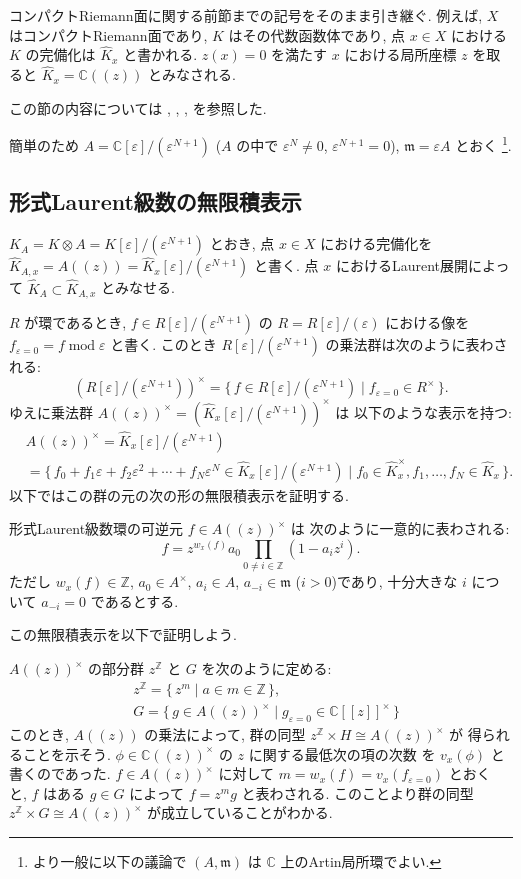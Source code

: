 \documentclass[12pt,twoside]{jarticle}
\newcommand\Z{{\mathbb Z}} %
\newcommand\C{{\mathbb C}} %
\theoremstyle{definition} %
\theoremstyle{definition} %
\theoremstyle{definition} %
\numberwithin{theorem}{section}
\numberwithin{equation}{section}
\numberwithin{figure}{section}
\numberwithin{table}{section}
\newcommand\Khat{{\widehat K}}
\newcommand\eps{\varepsilon}
\newcommand\m{{\mathfrak m}}
\newcommand\MOD{\operatorname{mod}}
\begin{document}
コンパクトRiemann面に関する前節までの記号をそのまま引き継ぐ.
例えば, $X$ はコンパクトRiemann面であり, $K$ はその代数函数体であり, 
点 $x\in X$ における $K$ の完備化は $\Khat_x$ と書かれる.
$z(x)=0$ を満たす $x$ における局所座標 $z$ を取ると $\Khat_x=\C((z))$
とみなされる.

この節の内容については \cite{kerr}, 
\cite{pablosromo}, \cite{luo}, \cite{horozov-luo}を参照した.

簡単のため $A=\C[\eps]/(\eps^{N+1})$ ($A$ の中で $\eps^N\ne0$, $\eps^{N+1}=0$), 
$\m=\eps A$ とおく%
\footnote{より一般に以下の議論で $(A,\m)$ は $\C$ 上のArtin局所環でよい.}.


\subsection{形式Laurent級数の無限積表示}

$K_A=K\otimes A=K[\eps]/(\eps^{N+1})$ とおき, 
点 $x\in X$ における完備化を $\Khat_{A,x}=A((z))=\Khat_x[\eps]/(\eps^{N+1})$ と書く.  
点 $x$ におけるLaurent展開によって $\Khat_A\subset\Khat_{A,x}$ とみなせる.

$R$ が環であるとき, $f\in R[\eps]/(\eps^{N+1})$ の $R=R[\eps]/(\eps)$ 
における像を $f_{\eps=0}=f\MOD\eps$ と書く.
このとき $R[\eps]/(\eps^{N+1})$ の乗法群は次のように表わされる:
\[
 \left( R[\eps]/(\eps^{N+1}) \right)^\times
 =\{\, f\in R[\eps]/(\eps^{N+1}) \mid f_{\eps=0}\in R^\times \,\}.
\]
ゆえに乗法群 $A((z))^\times=\left(\Khat_x[\eps]/(\eps^{N+1})\right)^\times$ は
以下のような表示を持つ:
\begin{align*}
&
A((z))^\times = \Khat_x[\eps]/(\eps^{N+1})
\\ &
=
\{\, f_0+f_1\eps+f_2\eps^2+\cdots+f_N\eps^N \in\Khat_x[\eps]/(\eps^{N+1}) 
\mid f_0\in\Khat_x^\times, f_1,\ldots,f_N\in\Khat_x \,\}.
\end{align*}
以下ではこの群の元の次の形の無限積表示を証明する.

形式Laurent級数環の可逆元 $f\in A((z))^\times$ は
次のように一意的に表わされる:
\[
f = z^{w_x(f)}a_0\prod_{0\ne i\in\Z}(1-a_i z^i).
\]
ただし $w_x(f)\in\Z$, $a_0\in A^\times$, $a_i\in A$, $a_{-i}\in\m$ ($i>0$)であり, 
十分大きな $i$ について $a_{-i}=0$ であるとする.

この無限積表示を以下で証明しよう. 

$A((z))^\times$ の部分群 $z^\Z$ と $G$ を次のように定める:
\begin{align*}
&
z^\Z = \{\, z^m \mid a\in m\in \Z \,\},
\\ &
G=\{\,g\in A((z))^\times\mid g_{\eps=0}\in \C[[z]]^\times \,\}
\end{align*}
このとき, $A((z))$ の乗法によって, 
群の同型 $z^\Z\times H \cong A((z))^\times$ が
得られることを示そう.
$\phi\in\C((z))^\times$ の $z$ に関する最低次の項の次数
を $v_x(\phi)$ と書くのであった. 
$f\in A((z))^\times$ に対して $m=w_x(f)=v_x(f_{\eps=0})$ とおく
と, $f$ はある $g\in G$ によって $f=z^m g$ と表わされる.
このことより群の同型 $z^\Z\times G \cong A((z))^\times$ 
が成立していることがわかる.
\end{document}
